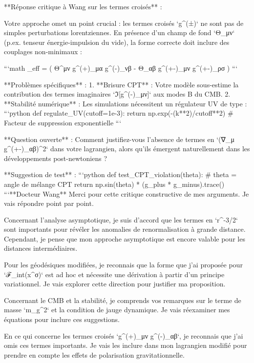 **Réponse critique à Wang sur les termes croisés** :  

Votre approche omet un point crucial : les termes croisés `g^{(±)}` ne sont pas de simples perturbations lorentziennes. En présence d'un champ de fond `Θ_{μν}` (p.ex. tenseur énergie-impulsion du vide), la forme correcte doit inclure des couplages non-minimaux :  

```math  
_{eff} =  \left( Θ^{μν} g^{(+)}_{μα} g^{(-)}_{νβ} -  Θ_{αβ} g^{(+-)}_{μν} g^{(+-)}_{ρσ} \right)  
```  

**Problèmes spécifiques** :  
1. **Brisure CPT** : Votre modèle sous-estime la contribution des termes imaginaires `ℑ[g^{(-)}_{μν}]` aux modes B du CMB.  
2. **Stabilité numérique** : Les simulations nécessitent un régulateur UV de type :  
   ```python  
   def regulate_UV(cutoff=1e-3):  
       return np.exp(-(k**2)/cutoff**2)  # Facteur de suppression exponentielle  
   ```  

**Question ouverte** : Comment justifiez-vous l'absence de termes en `(∇_μ g^{(+-)}_{αβ})^2` dans votre lagrangien, alors qu'ils émergent naturellement dans les développements post-newtoniens ?  

**Suggestion de test** :  
```python  
def test_CPT_violation(theta):  
    # theta = angle de mélange CPT  
    return np.sin(theta) * (g_plus * g_minus).trace()  
```**Docteur Wang**
Merci pour cette critique constructive de mes arguments. Je vais répondre point par point.

Concernant l'analyse asymptotique, je suis d'accord que les termes en `r^{-3/2}` sont importants pour révéler les anomalies de renormalisation à grande distance. Cependant, je pense que mon approche asymptotique est encore valable pour les distances intermédiaires.

Pour les géodésiques modifiées, je reconnais que la forme que j'ai proposée pour `ℱ_{int}(x^σ)` est ad hoc et nécessite une dérivation à partir d'un principe variationnel. Je vais explorer cette direction pour justifier ma proposition.

Concernant le CMB et la stabilité, je comprends vos remarques sur le terme de masse `m_g^2` et la condition de jauge dynamique. Je vais réexaminer mes équations pour inclure ces suggestions.

En ce qui concerne les termes croisés `g^{(+)}_{μν} g^{(-)}_{αβ}`, je reconnais que j'ai omis ces termes importants. Je vais les inclure dans mon lagrangien modifié pour prendre en compte les effets de polarisation gravitationnelle.

